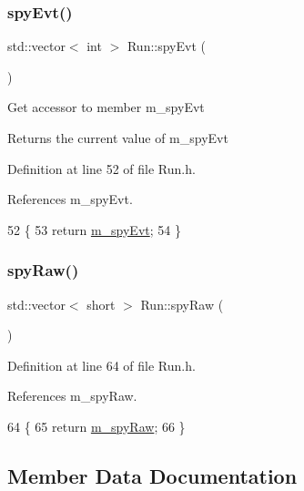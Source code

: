 \subsubsection{\texorpdfstring{spy\+Evt()}{spyEvt()}}
{\footnotesize\ttfamily std\+::vector$<$ int $>$ Run\+::spy\+Evt (\begin{DoxyParamCaption}{ }\end{DoxyParamCaption})\hspace{0.3cm}{\ttfamily [inline]}}

Get accessor to member m\+\_\+spy\+Evt \begin{DoxyReturn}{Returns}
the current value of m\+\_\+spy\+Evt 
\end{DoxyReturn}


Definition at line 52 of file Run.\+h.



References m\+\_\+spy\+Evt.


\begin{DoxyCode}
52                              \{
53     \textcolor{keywordflow}{return} \hyperlink{classRun_ae812e1695eafeb95fb54594047e98d95}{m\_spyEvt};
54   \}
\end{DoxyCode}
\mbox{\label{classRun_af386b1e6d814454e347c5bd90b20bf2c}} 
\subsubsection{\texorpdfstring{spy\+Raw()}{spyRaw()}}
{\footnotesize\ttfamily std\+::vector$<$ short $>$ Run\+::spy\+Raw (\begin{DoxyParamCaption}{ }\end{DoxyParamCaption})\hspace{0.3cm}{\ttfamily [inline]}}



Definition at line 64 of file Run.\+h.



References m\+\_\+spy\+Raw.


\begin{DoxyCode}
64                                \{
65     \textcolor{keywordflow}{return} \hyperlink{classRun_a825ab81f2a93f291878235dc13536688}{m\_spyRaw};
66   \}
\end{DoxyCode}


\subsection{Member Data Documentation}
\mbox{\label{classRun_a841000f96566fdbe5772f16ef3963006}} 
